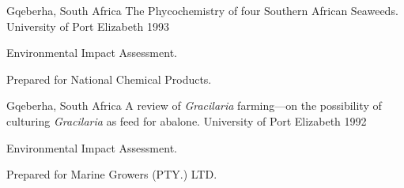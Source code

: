 \begin{cventries}
\cventry
{Gqeberha, South Africa} %
{The Phycochemistry of four Southern African Seaweeds.} %
{University of Port Elizabeth} %
{1993} %
{ %
\begin{cvitems}
\item {Environmental Impact Assessment.}
\item Prepared for National Chemical Products.
\end{cvitems} 
}


\cventry
{Gqeberha, South Africa} %
{A review of \emph{Gracilaria} farming---on the possibility of culturing \emph{Gracilaria} as feed for abalone.} %
{University of Port Elizabeth} %
{1992} %
{ %
\begin{cvitems}
\item {Environmental Impact Assessment.}
\item Prepared for Marine Growers (PTY.) LTD.
\end{cvitems} 
}

\end{cventries}